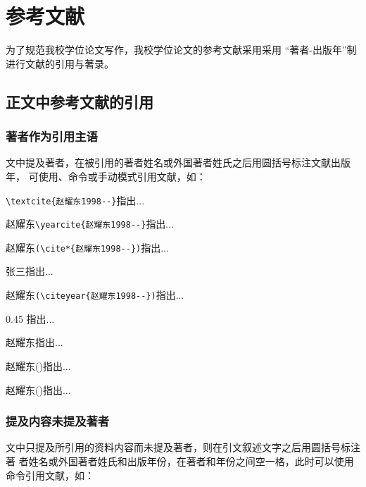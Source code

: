 \chapter{参考文献}

为了规范我校学位论文写作，我校学位论文的参考文献采用采用
\enquote{著者-出版年}制进行文献的引用与著录。

\section{正文中参考文献的引用}
\subsection{著者作为引用主语}
文中提及著者，在被引用的著者姓名或外国著者姓氏之后用圆括号标注文献出版年，
可使用、命令或手动模式引用文献，如：

\begin{center}
  \begin{minipage}{0.45\textwidth}
    \small
    \verb|\textcite{赵耀东1998--}|指出...

    赵耀东\verb|\yearcite{赵耀东1998--}|指出...

    赵耀东\verb|(\cite*{赵耀东1998--})|指出...

    张三指出...

    赵耀东\verb|(\citeyear{赵耀东1998--})|指出...
  \end{minipage}
  \begin{boxedminipage}{0.45\textwidth}
    \small
    \textcite{赵耀东1998--}指出...

    赵耀东指出...

    赵耀东(\cite*{赵耀东1998--})指出...

    赵耀东(\citeyear{赵耀东1998--})指出...
  \end{boxedminipage}
\end{center}


\subsection{提及内容未提及著者}

文中只提及所引用的资料内容而未提及著者，则在引文叙述文字之后用圆括号标注著
者姓名或外国著者姓氏和出版年份，在著者和年份之间空一格，此时可以使用
命令引用文献，如：

